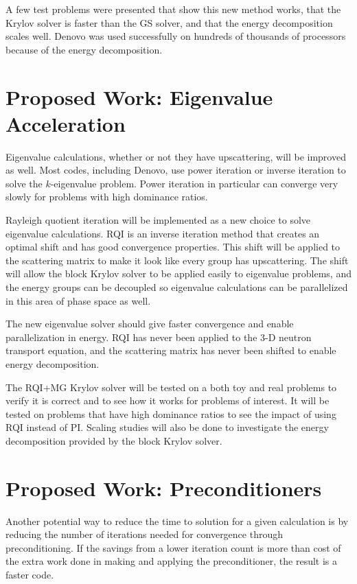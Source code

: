 A few test problems were presented that show this new method works, that the Krylov solver is faster than the GS solver, and that the energy decomposition scales well. Denovo was used successfully on hundreds of thousands of processors because of the energy decomposition.

\section{Proposed Work: Eigenvalue Acceleration}
Eigenvalue calculations, whether or not they have upscattering, will be improved as well. Most \Sn codes, including Denovo, use power iteration or inverse iteration to solve the $k$-eigenvalue problem. Power iteration in particular can converge very slowly for problems with high dominance ratios. 

Rayleigh quotient iteration will be implemented as a new choice to solve eigenvalue calculations. RQI is an inverse iteration method that creates an optimal shift and has good convergence properties. This shift will be applied to the scattering matrix to make it look like every group has upscattering. The shift will allow the block Krylov solver to be applied easily to eigenvalue problems, and the energy groups can be decoupled so eigenvalue calculations can be parallelized in this area of phase space as well. 

The new eigenvalue solver should give faster convergence and enable parallelization in energy. RQI has never been applied to the 3-D neutron transport equation, and the scattering matrix has never been shifted to enable energy decomposition.

The RQI+MG Krylov solver will be tested on a both toy and real problems to verify it is correct and to see how it works for problems of interest. It will be tested on problems that have high dominance ratios to see the impact of using RQI instead of PI. Scaling studies will also be done to investigate the energy decomposition provided by the block Krylov solver.

\section{Proposed Work: Preconditioners}
Another potential way to reduce the time to solution for a given calculation is by reducing the number of iterations needed for convergence through preconditioning. If the savings from a lower iteration count is more than cost of the extra work done in making and applying the preconditioner, the result is a faster code. 

